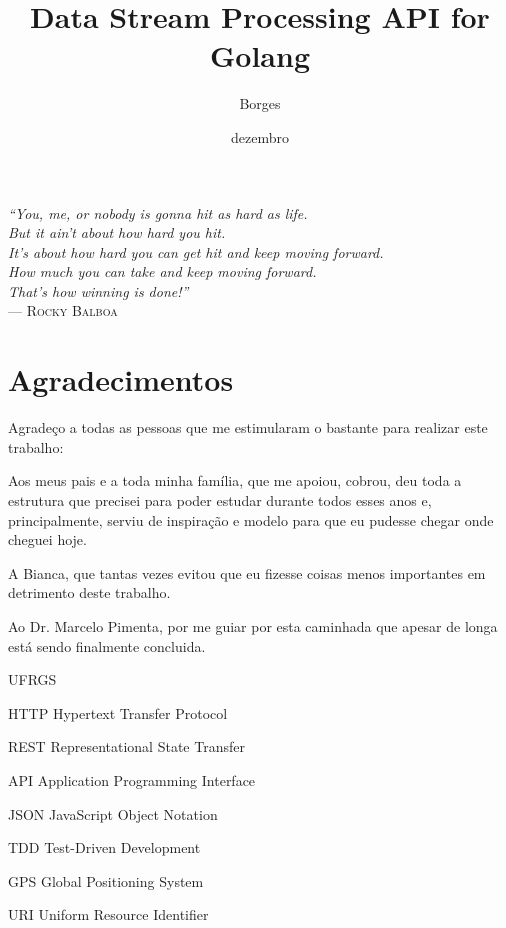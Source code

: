\documentclass[tc]{iiufrgs}
\title{Data Stream Processing API for Golang}
\author{Borges}{Diego}
\date{dezembro}{2015}
\begin{document}
\maketitle

\clearpage
\begin{flushright}
\mbox{}\vfill
{\sffamily\itshape
``You, me, or nobody is gonna hit as hard as life. \\
  But it ain't about how hard you hit. \\
  It's about how hard you can get hit and keep moving forward. \\
  How much you can take and keep moving forward. \\
  That's how winning is done!''\\}
--- \textsc{Rocky Balboa}
\end{flushright}

\chapter*{Agradecimentos} %
\label{cha:agradecimentos}
Agradeço a todas as pessoas que me estimularam o bastante para realizar este trabalho:

Aos meus pais e a toda minha família, que me apoiou, cobrou, deu toda a estrutura que precisei para poder estudar durante todos esses anos e, principalmente, serviu de inspiração e modelo para que eu pudesse chegar onde cheguei hoje.

A Bianca, que tantas vezes evitou que eu fizesse coisas menos importantes em detrimento deste trabalho.

Ao Dr. Marcelo Pimenta, por me guiar por esta caminhada que apesar de longa está sendo finalmente concluida.

%
%

\tableofcontents

\begin{listofabbrv}{UFRGS}
        \item[HTTP] Hypertext Transfer Protocol
        \item[REST] Representational State Transfer
        \item[API] Application Programming Interface
        \item[JSON] JavaScript Object Notation
        \item[TDD] Test-Driven Development
        \item[GPS] Global Positioning System
        \item[URI] Uniform Resource Identifier
\end{listofabbrv}
\end{document}
